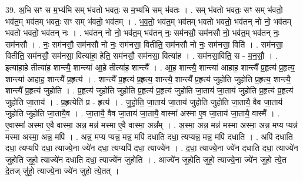 \documentclass[17pt]{extarticle}
\begin{document}
39. अ॒भि सꣳ स म॒भ्य॑भि सम् भ॑वतो भवतः॒ स म॒भ्य॑भि सम् भ॑वतः । . सम् भ॑वतो भवतः॒ सꣳ सम् भ॑वतो॒ भव॑त॒म् भव॑तम् भवतः॒ सꣳ सम् भ॑वतो॒ भव॑तम् । . भ॒व॒तो॒ भव॑त॒म् भव॑तम् भवतो भवतो॒ भव॑तन् नो नो॒ भव॑तम् भवतो भवतो॒ भव॑तन् नः । . भव॑तन् नो नो॒ भव॑त॒म् भव॑तन् नः॒ सम॑नसौ॒ सम॑नसौ नो॒ भव॑त॒म् भव॑तन् नः॒ सम॑नसौ । . नः॒ सम॑नसौ॒ सम॑नसौ नो नः॒ सम॑नसा॒ वितीति॒ सम॑नसौ नो नः॒ सम॑नसा॒ विति॑ । . सम॑नसा॒ वितीति॒ सम॑नसौ॒ सम॑नसा॒ वित्या॑हा॒ हेति॒ सम॑नसौ॒ सम॑नसा॒ वित्या॑ह । . सम॑नसा॒विति॒ स - म॒न॒सौ॒ । . इत्या॑हा॒हे तीत्या॑ह॒ शान्त्यै॒ शान्त्या॑ आ॒हे तीत्या॑ह॒ शान्त्यै᳚ । . आ॒ह॒ शान्त्यै॒ शान्त्या॑ आहाह॒ शान्त्यै᳚ प्र॒हृत्य॑ प्र॒हृत्य॒ शान्त्या॑ आहाह॒ शान्त्यै᳚ प्र॒हृत्य॑ । . शान्त्यै᳚ प्र॒हृत्य॑ प्र॒हृत्य॒ शान्त्यै॒ शान्त्यै᳚ प्र॒हृत्य॑ जुहोति जुहोति प्र॒हृत्य॒ शान्त्यै॒ शान्त्यै᳚ प्र॒हृत्य॑ जुहोति । . प्र॒हृत्य॑ जुहोति जुहोति प्र॒हृत्य॑ प्र॒हृत्य॑ जुहोति जा॒ताय॑ जा॒ताय॑ जुहोति प्र॒हृत्य॑ प्र॒हृत्य॑ जुहोति जा॒ताय॑ । . प्र॒हृत्येति॑ प्र - हृत्य॑ । . जु॒हो॒ति॒ जा॒ताय॑ जा॒ताय॑ जुहोति जुहोति जा॒तायै॒ वैव जा॒ताय॑ जुहोति जुहोति जा॒तायै॒व । . जा॒तायै॒ वैव जा॒ताय॑ जा॒तायै॒ वास्मा॑ अस्मा ए॒व जा॒ताय॑ जा॒तायै॒ वास्मै᳚ । . ए॒वास्मा॑ अस्मा ए॒वै वास्मा॒ अन्न॒ मन्न॑ मस्मा ए॒वै वास्मा॒ अन्न᳚म् । . अ॒स्मा॒ अन्न॒ मन्न॑ मस्मा अस्मा॒ अन्न॒ मप्य प्यन्न॑ मस्मा अस्मा॒ अन्न॒ मपि॑ । . अन्न॒ मप्य प्यन्न॒ मन्न॒ मपि॑ दधाति दधा॒ त्यप्यन्न॒ मन्न॒ मपि॑ दधाति । . अपि॑ दधाति दधा॒ त्यप्यपि॑ दधा॒ त्याज्ये॒ना ज्ये॑न दधा॒ त्यप्यपि॑ दधा॒ त्याज्ये॑न । . द॒धा॒ त्याज्ये॒ना ज्ये॑न दधाति दधा॒ त्याज्ये॑न जुहोति जुहो॒ त्याज्ये॑न दधाति दधा॒ त्याज्ये॑न जुहोति । . आज्ये॑न जुहोति जुहो॒ त्याज्ये॒ना ज्ये॑न जुहो त्ये॒त दे॒तज् जु॑हो॒ त्याज्ये॒ना ज्ये॑न जुहो त्ये॒तत् । \newline
\end{document}
